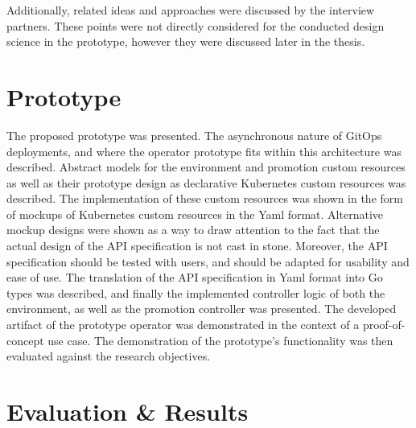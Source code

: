 Additionally,
related ideas and approaches were discussed by the interview partners.
These points were not directly considered for the conducted design science in the prototype,
however they were discussed later in the thesis.

\section*{Prototype}

The proposed prototype was presented.
The asynchronous nature of GitOps deployments, and where
the operator prototype fits within this architecture was described.
Abstract models for the environment and promotion custom resources as well as their prototype
design as declarative Kubernetes custom resources was described.
The implementation of these custom resources was shown in the form of mockups
of Kubernetes custom resources in the Yaml format.
Alternative mockup designs were shown as a way to draw attention to the fact
that the actual design of the API specification is not cast in stone.
Moreover, the API specification should be tested with users,
and should be adapted for usability and ease of use.
The translation of the API specification in Yaml format into Go types was described,
and finally the implemented controller logic of both the environment, as well as
the promotion controller was presented.
The developed artifact of the prototype operator was
demonstrated in the context of a proof-of-concept use case.
The demonstration of the prototype's functionality was then evaluated against
the research objectives.

\section*{Evaluation \& Results}

